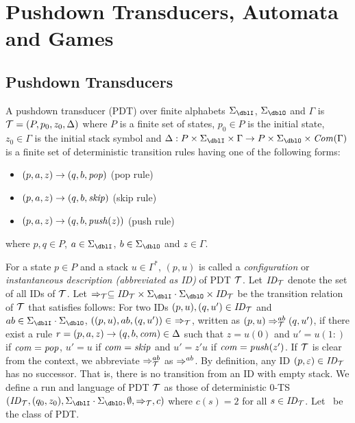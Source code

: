 \section{Pushdown Transducers, Automata and Games}
\subsection{Pushdown Transducers}
\begin{definition}
A {pushdown transducer} (PDT)
over finite alphabets $\Sigma_\dblI$, $\Sigma_\dblO$ and $\Gamma$
is ${\cal T}=(P, p_0, z_0, \Delta)$ where
$P$ is a finite set of states,
$p_0\in P$ is the initial state,
$z_0\in \Gamma$ is the initial stack symbol and
$\Delta: P\times \Sigma_\dblI \times \Gamma \to P\times \Sigma_\dblO \times \Com(\Gamma)$ is a finite set of deterministic transition rules having one of the following forms:
\begin{itemize}
\item $(p, a, z) \rightarrow (q, b, \mathit{pop})$ \quad (pop rule)
\item $(p, a, z) \rightarrow (q, b, \mathit{skip})$ \quad (skip rule)
\item $(p, a, z) \rightarrow (q, b, \mathit{push}(z))$ \quad (push rule)
\end{itemize}
where $p, q\in P$, $a\in\Sigma_\dblI$, $b\in\Sigma_\dblO$ and $z\in\Gamma$.
\end{definition}
\noindent
For a state $p\in P$ and
a stack $u \in \Gamma^*$,
$(p, u)$ is called
a {\em configuration} or {\em instantaneous description (abbreviated as ID)} of PDT ${\cal T}$. Let $\mathit{ID}_{\cal T}$ denote the set of all IDs of ${\cal T}$.
Let $\Rightarrow_\calT\subseteq \ID_\calT\times \Sigma_\dblI\cdot\Sigma_\dblO\times \ID_\calT$ be the transition relation of ${\cal T}$ that satisfies follows:
For two IDs $(p, u), (q, u')\in \mathit{ID}_{\cal T}$ and $ab\in\Sigma_\dblI\cdot \Sigma_\dblO$,
$((p, u), ab, (q, u'))\in\ \Rightarrow_{\cal T}$,
written as $(p, u) \Rightarrow_{{\cal T}}^{ab} (q, u')$,
if there exist a rule $r=(p, a, z) \rightarrow (q, b, \mathit{com}) \in \Delta$
such that $z=u(0)$ and $u'={u(1:)}$ if $\mathit{com}=\mathit{pop}$, $u'=u$ if $\mathit{com}=\mathit{skip}$ and $u'=z'u$ if $\mathit{com}=\mathit{push}(z')$.
If ${\cal T}$ is clear from the context,
we abbreviate
$\Rightarrow_{{\cal T}}^{ab}$ as $\Rightarrow^{ab}$.
By definition, any ID $(p, \varepsilon)\in\mathit{ID}_{{\cal T}}$ has
no successor.
That is, there is no transition from an ID with empty stack.
We define a run and language of PDT ${\cal T}$ as those of
deterministic $0$-TS $(\ID_\calT, (q_0,z_0), \Sigma_\dblI\cdot\Sigma_\dblO, \emptyset, \Rightarrow_\calT, c)$ where $c(s)=2$ for all $s\in\mathit{ID}_{\cal T}$.
Let \PDT\ be the class of PDT.

